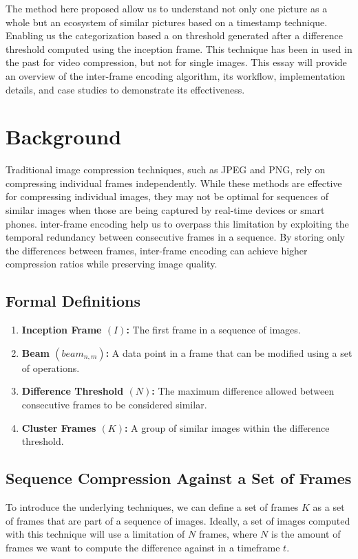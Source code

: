 \documentclass[twocolumn]{article}
\begin{document}
The method here proposed allow us to understand not only one picture as a whole but an ecosystem of similar pictures based on a timestamp technique. Enabling us the categorization based a on threshold generated after a difference threshold computed using the inception frame. This technique has been in used in the past for video compression, but not for single images. This essay will provide an overview of the inter-frame encoding algorithm, its workflow, implementation details, and case studies to demonstrate its effectiveness.

\section{Background}
Traditional image compression techniques, such as JPEG and PNG, rely on compressing individual frames independently. While these methods are effective for compressing individual images, they may not be optimal for sequences of similar images when those are being captured by real-time devices or smart phones. inter-frame encoding help us to overpass this limitation by exploiting the temporal redundancy between consecutive frames in a sequence. By storing only the differences between frames, inter-frame encoding can achieve higher compression ratios while preserving image quality.

\subsection{Formal Definitions}

\begin{enumerate}
    \item \textbf{Inception Frame $(I)$:} The first frame in a sequence of images.
    \item \textbf{Beam $(beam_{n,m})$:} A data point in a frame that can be modified using a set of operations.
    \item \textbf{Difference Threshold $(N)$:} The maximum difference allowed between consecutive frames to be considered similar.
    \item \textbf{Cluster Frames $(K)$:} A group of similar images within the difference threshold.
\end{enumerate}


\subsection{Sequence Compression Against a Set of Frames}
To introduce the underlying techniques, we can define a set of frames $K$ as a set of frames that are part of a sequence of images. Ideally, a set of images computed with this technique will use a limitation of $N$ frames, where $N$ is the amount of frames we want to compute the difference against in a timeframe $t$.
\end{document}
